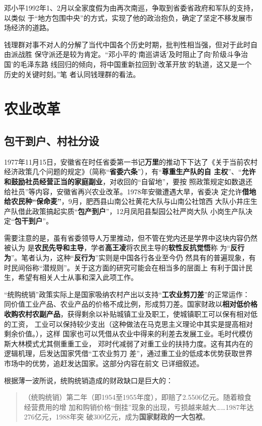 邓小平1992年1、2月以全家度假为由再次南巡，争取到省委省政府和军队的支持，以类似
于“地方包围中央”的方式，实现了他的政治抱负，确定了坚定不移发展市场经济的道路。

钱理群对事不对人的分解了当代中国各个历史时期，批判性相当强，但对于此时自由派战胜
保守派还是较为肯定。“邓小平的‘南巡讲话’及时阻止了向‘阶级斗争治国’的毛泽东路
线回归的倾向，将中国重新拉回到‘改革开放’的轨道，这又是一个历史的关键时刻。”笔
者认同钱理群的看法。

\section{农业改革}

\subsection{包干到户、村社分设}

1977年11月15日，安徽省在时任省委第一书记\textbf{万里}的推动下下达了《关于当前农村
经济政策几个问题的规定》（简称“\textbf{省委六条}”），有“\textbf{尊重生产队的自
  主权}”、“\textbf{允许和鼓励社员经营正当的家庭副业}，对收回的“自留地”，要按
照政策规定如数退还给社员”等内容，安徽省再兴农业改革。1978年安徽遭遇大旱，省委决
定允许\textbf{借地给农民种“保命麦”}，9月，肥西县山南公社黄花大队与山南公社馆西
大队小井庄生产队借此政策搞起实质“\textbf{包产到户}”，12月凤阳县梨园公社严岗大队
小岗生产队决定“\textbf{包干到户}”。

需要注意的是，虽有省委领导人万里推动，但不管在党内还是学界中这块内容仍然被认为
是\textbf{农民先导和主导}，学者\textbf{高王凌}将农民主导的\textbf{软性反抗觉悟}称
为“\textbf{反行为}”。笔者认为，这种“\textbf{反行为}”实则是中国各行各业至今仍
然具有的普遍现象，有时民间俗称“潜规则”。关于这方面的研究可能会在相当多的层面上
有利于国计民生，希望有相关人士从事和深入此项工作。

“统购统销”政策实际上是国家吸纳农村产出以支持“\textbf{工农业剪刀差}”的正常运作：
同价值工业产品、农业产品的价格不成比例，形成剪刀差。国家财政以\textbf{相对低价格
  收购农村农副产品}，获得剩余以补贴城镇工业及职工，使城镇职工可以保有相对低的工资，
工业可以保持较少支出（这种做法在马克思主义理论中其实是提高相对剩余价值。），这样
国家也可以凭借从农业中得来的利差去发展工业。毛时代模仿斯大林模式尤其侧重重工业，
邓时代减弱了对重工业的扶持力度。这有其内在的逻辑机理，后发达国家凭借“工农业剪刀
差”，通过重工业的低成本优势获取世界市场中的优势，追赶发达国家。这部分内容在前文
已详细叙述。

根据薄一波所说，统购统销造成的财政缺口是巨大的：
\begin{quotation}
  （统购统销）第二年（即1954至1955年度），即赔了2.5506亿元。随着粮食经营费用的增
  加和购销价格“倒挂”现象的出现，亏损越来越大……1987年达276亿元，1988年突
  破300亿元，成为\textbf{国家财政的一大包袱}。
\end{quotation}

